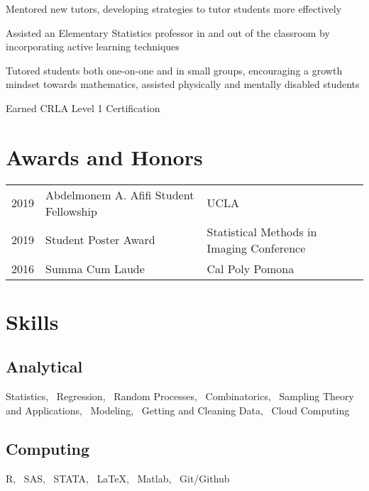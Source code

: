 \documentclass[]{deedy-resume-openfont}
\begin{document}
\vspace{-.25em}
\begin{tightemize}
\item Mentored new tutors, developing strategies to tutor students more effectively
\item Assisted an Elementary Statistics professor in and out of the classroom by incorporating active learning techniques
\item Tutored students both one-on-one and in small groups, encouraging a growth mindset towards mathematics, assisted physically and mentally disabled students
\item Earned CRLA Level 1 Certification
\end{tightemize}
\sectionsep

\section{Awards and Honors} 
\begin{tabular}{rll}
2019 & Abdelmonem A. Afifi Student Fellowship & UCLA \\
2019 & Student Poster Award                   & Statistical Methods in Imaging Conference \\ 
2016 & Summa Cum Laude                        & Cal Poly Pomona \\ 
\end{tabular}
\sectionsep

\section{Skills}
\begin{minipage}[t]{.6\textwidth}
\subsection{Analytical}
Statistics, \, Regression, \, Random Processes, \, Combinatorics, \, Sampling Theory and Applications, \, Modeling, \, Getting and Cleaning Data, \, Cloud Computing
\sectionsep
\end{minipage}
\hfill
\begin{minipage}[t]{.35\textwidth}
\subsection{Computing}
R, \, SAS, \, STATA, \, \LaTeX, \, Matlab, \,  Git/Github
\end{minipage}
\end{document}
